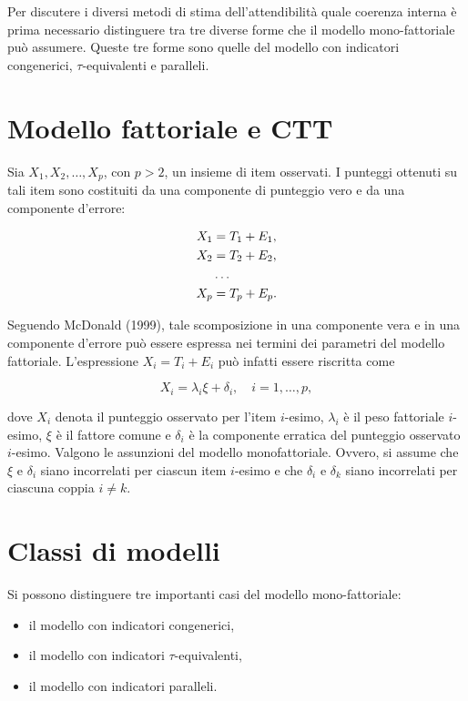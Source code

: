 \documentclass[
  11pt,
]{krantz}
\providecommand{\tightlist}{%
  \setlength{\itemsep}{0pt}\setlength{\parskip}{0pt}}
\theoremstyle{definition}
\theoremstyle{definition}
\theoremstyle{definition}
\theoremstyle{definition}
\theoremstyle{remark}
\begin{document}
Per discutere i diversi metodi di stima dell'attendibilità quale coerenza interna è prima necessario distinguere tra tre diverse forme che il modello mono-fattoriale può assumere. Queste tre forme sono quelle del modello con indicatori congenerici, \(\tau\)-equivalenti e paralleli.

\hypertarget{modello-fattoriale-e-ctt}{%
\section{Modello fattoriale e CTT}\label{modello-fattoriale-e-ctt}}

Sia \(X_1, X_2, \dots, X_p\), con \(p>2\), un insieme di item osservati. I punteggi ottenuti su tali item sono costituiti da una componente di punteggio vero e da una componente d'errore:

\begin{equation}
\begin{aligned}
X_1 &=T_1+E_1,\notag\\ 
X_2 &=T_2+E_2,\notag\\ 
&\dots\notag\\ 
X_p &=T_p+E_p.\notag
\end{aligned}
\end{equation}

Seguendo McDonald (1999), tale scomposizione in una componente vera e in una componente d'errore può essere espressa nei termini dei parametri del modello fattoriale. L'espressione \(X_i = T_i + E_i\) può infatti essere riscritta come

\[
X_i = \lambda_i \xi + \delta_i, \quad{i=1, \dots, p},
\]

dove \(X_i\) denota il punteggio osservato per l'item \(i\)-esimo, \(\lambda_i\) è il peso fattoriale \(i\)-esimo, \(\xi\) è il fattore comune e \(\delta_i\) è la componente erratica del punteggio osservato \(i\)-esimo. Valgono le assunzioni del modello monofattoriale. Ovvero, si assume che \(\xi\) e \(\delta_i\) siano incorrelati per ciascun item \(i\)-esimo e che \(\delta_i\) e \(\delta_k\) siano incorrelati per ciascuna coppia \(i \neq k\).

\hypertarget{classi-di-modelli}{%
\section{Classi di modelli}\label{classi-di-modelli}}

Si possono distinguere tre importanti casi del modello mono-fattoriale:

\begin{itemize}
\tightlist
\item
  il modello con indicatori congenerici,
\item
  il modello con indicatori \(\tau\)-equivalenti,
\item
  il modello con indicatori paralleli.
\end{itemize}
\end{document}
